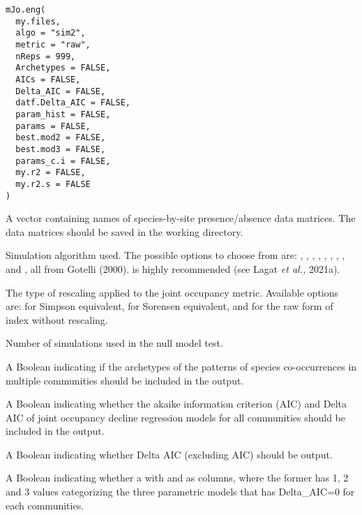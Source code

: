 \documentclass[a4paper]{book}
\begin{document}
%
\begin{Usage}
\begin{verbatim}
mJo.eng(
  my.files,
  algo = "sim2",
  metric = "raw",
  nReps = 999,
  Archetypes = FALSE,
  AICs = FALSE,
  Delta_AIC = FALSE,
  datf.Delta_AIC = FALSE,
  param_hist = FALSE,
  params = FALSE,
  best.mod2 = FALSE,
  best.mod3 = FALSE,
  params_c.i = FALSE,
  my.r2 = FALSE,
  my.r2.s = FALSE
)
\end{verbatim}
\end{Usage}
%
\begin{Arguments}
\begin{ldescription}
\item[\code{my.files}] A vector containing names of species-by-site presence/absence  data matrices.
The data matrices should be saved in the working directory.

\item[\code{algo}] Simulation algorithm used. The possible options to choose from are: ,
, , , , , , , and , all from
Gotelli (2000).  is highly recommended (see Lagat \emph{et al.,} 2021a).

\item[\code{metric}] The type of rescaling applied to the joint occupancy metric. Available options are:
 for Simpson equivalent,  for Sorensen equivalent, and  for the
raw form of index without rescaling.

\item[\code{nReps}] Number of simulations used in the null model test.

\item[\code{Archetypes}] A Boolean indicating if the archetypes of the patterns
of species co-occurrences in multiple communities should be included in the output.

\item[\code{AICs}] A Boolean indicating whether the akaike information criterion (AIC) and Delta AIC
of joint occupancy decline regression models for all communities should be included in the output.

\item[\code{Delta\_AIC}] A Boolean indicating whether Delta AIC (excluding AIC) should be output.

\item[\code{datf.Delta\_AIC}] A Boolean indicating whether a  with  and  as
columns, where the former has 1, 2 and 3 values categorizing the three parametric models that has
Delta\_AIC=0 for each communities.


\end{ldescription}
\end{Arguments}
\end{document}
